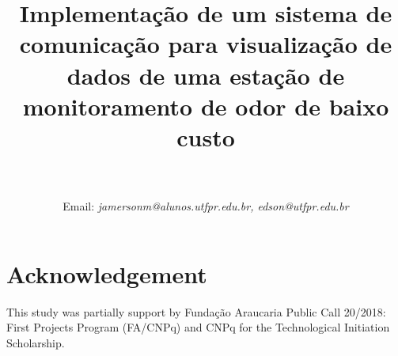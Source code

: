 \documentclass[conference]{IEEEtran}
\begin{document}
\title{Implementação de um sistema de comunicação para visualização de dados de uma estação de monitoramento de odor de baixo custo}
\author{ \\

     
 Email: \textit{jamersonm@alunos.utfpr.edu.br, edson@utfpr.edu.br}  }


\maketitle
\pagestyle{plain}








\section{Acknowledgement}
This study was partially support by Fundação Araucaria Public Call 20/2018: First Projects Program (FA/CNPq) and CNPq for the Technological Initiation Scholarship.


\end{document}
